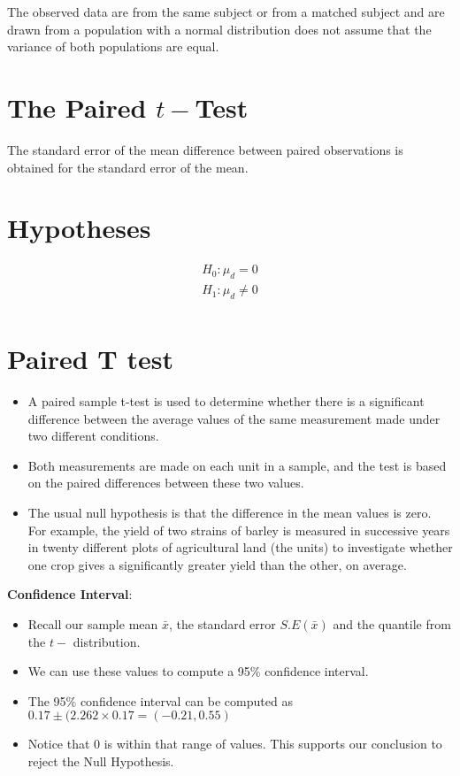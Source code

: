 The observed data are from the same subject or from a matched subject and are drawn from a population with a normal distribution
does not assume that the variance of both populations are equal.








\section{The Paired $t-$Test}



\begin{framed}
The standard error of the mean difference between paired
observations is obtained for the standard error of the mean.
\section{Hypotheses}
\begin{eqnarray*}
H_{0}: \mu_{d} = 0\\
H_{1}: \mu_{d} \neq 0\\
\end{eqnarray*}
\end{framed}



\section{Paired T test}
\begin{itemize} \item A paired sample t-test is used to determine whether there is a significant difference between the average values of the same measurement made under two different conditions. \item Both measurements are made on each unit in a sample, and the test is based on the paired differences between these two values. \item The usual null hypothesis is that the difference in the mean values is zero. For example, the yield of two strains of barley is measured in successive years in twenty different plots of agricultural land (the units) to investigate whether one crop gives a significantly greater yield than the other, on average.
\end{itemize}

\textbf{Confidence Interval}:
\begin{itemize}
\item Recall our sample mean $\bar{x}$, the standard error $S.E(\bar{x})$ and the quantile from the $t-$ distribution.
\item We can use these values to compute a 95\% confidence interval.
\item The 95\% confidence interval can be computed as $0.17 \pm (2.262 \times 0.17 = (-0.21,0.55)$
\item Notice that 0 is within that range of values. This supports our conclusion to reject the Null Hypothesis.
\end{itemize}


